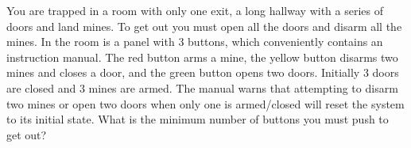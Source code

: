 You are trapped in a room with only one exit, a long hallway with a series of doors and land mines. To get out you must open all the doors and disarm all the mines. In the room is a panel with $3$ buttons, which conveniently contains an instruction manual. The red button arms a mine, the yellow button disarms two mines and closes a door, and the green button opens two doors. Initially $3$ doors are closed and $3$ mines are armed. The manual warns that attempting to disarm two mines or open two doors when only one is armed/closed will reset the system to its initial state. What is the minimum number of buttons you must push to get out?